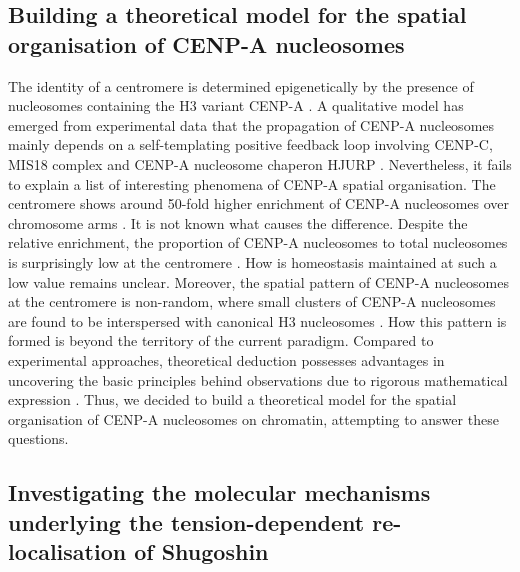 \subsection{Building a theoretical model for the spatial organisation of CENP-A nucleosomes}

The identity of a centromere is determined epigenetically by the presence of nucleosomes containing the H3 variant CENP-A \citep{Warburton1997ImmunolocalizationCentromeres, Vafa1997ChromatinPlate, Earnshaw1985ThreeChromosome, Liu2006MappingCells, Regnier2005CENP-ABubR1, Heun2006, Mendiburo2011, Barnhart2011, Logsdon2015, Logsdon2019}. A qualitative model has emerged from experimental data that the propagation of CENP-A nucleosomes mainly depends on a self-templating positive feedback loop involving CENP-C, MIS18 complex and CENP-A nucleosome chaperon HJURP \citep{McKinley2015, Stirpe2022}. Nevertheless, it fails to explain a list of interesting phenomena of CENP-A spatial organisation. The centromere shows around 50-fold higher enrichment of CENP-A nucleosomes over chromosome arms \citep{Bodor2014}. It is not known what causes the difference. Despite the relative enrichment, the proportion of CENP-A nucleosomes to total nucleosomes is surprisingly low at the centromere \citep{Bodor2014, Schittenhelm2010}. How is homeostasis maintained at such a low value remains unclear. Moreover, the spatial pattern of CENP-A nucleosomes at the centromere is non-random, where small clusters of CENP-A nucleosomes are found to be interspersed with canonical H3 nucleosomes \citep{Blower2002ConservedHumans, Dunleavy2011H3.3Phase., Kyriacou2018}. How this pattern is formed is beyond the territory of the current paradigm. Compared to experimental approaches, theoretical deduction possesses advantages in uncovering the basic principles behind observations due to rigorous mathematical expression \citep{Fidelman1985TheModeling}. Thus, we decided to build a theoretical model for the spatial organisation of CENP-A nucleosomes on chromatin, attempting to answer these questions. 

\subsection{Investigating the molecular mechanisms underlying the tension-dependent re-localisation of Shugoshin}

